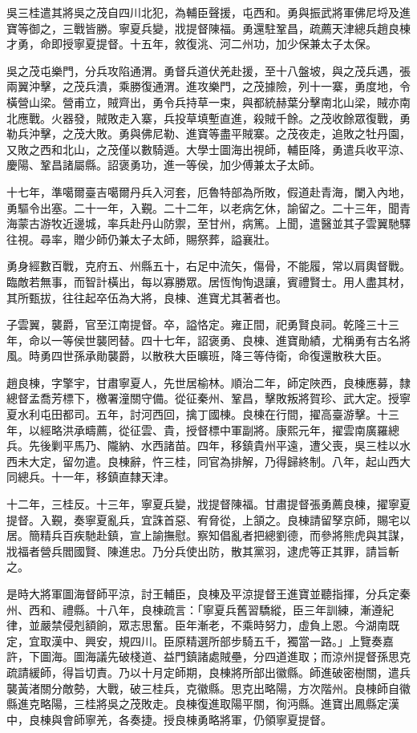 \begin{pinyinscope}
吳三桂遣其將吳之茂自四川北犯，為輔臣聲援，屯西和。勇與振武將軍佛尼埒及進寶等御之，三戰皆勝。寧夏兵變，戕提督陳福。勇還駐鞏昌，疏薦天津總兵趙良棟才勇，命即授寧夏提督。十五年，敘復洮、河二州功，加少保兼太子太保。

吳之茂屯樂門，分兵攻陷通渭。勇督兵道伏羌赴援，至十八盤坡，與之茂兵遇，張兩翼沖擊，之茂兵潰，乘勝復通渭。進攻樂門，之茂據險，列十一寨，勇度地，令橫營山梁。營甫立，賊齊出，勇令兵持草一束，與都統赫葉分擊南北山梁，賊亦南北應戰。火器發，賊敗走入寨，兵投草填塹直進，殺賊千餘。之茂收餘眾復戰，勇勒兵沖擊，之茂大敗。勇與佛尼勒、進寶等盡平賊寨。之茂夜走，追敗之牡丹園，又敗之西和北山，之茂僅以數騎遁。大學士圖海出視師，輔臣降，勇遣兵收平涼、慶陽、鞏昌諸屬縣。詔褒勇功，進一等侯，加少傅兼太子太師。

十七年，準噶爾臺吉噶爾丹兵入河套，厄魯特部為所敗，假道赴青海，闌入內地，勇驅令出塞。二十一年，入覲。二十二年，以老病乞休，諭留之。二十三年，聞青海蒙古游牧近邊城，率兵赴丹山防禦，至甘州，病篤。上聞，遣醫並其子雲翼馳驛往視。尋率，贈少師仍兼太子太師，賜祭葬，謚襄壯。

勇身經數百戰，克府五、州縣五十，右足中流矢，傷骨，不能履，常以肩輿督戰。臨敵若無事，而智計橫出，每以寡勝眾。居恆恂恂退讓，賓禮賢士。用人盡其材，其所甄拔，往往起卒伍為大將，良棟、進寶尤其著者也。

子雲翼，襲爵，官至江南提督。卒，謚恪定。雍正間，祀勇賢良祠。乾隆三十三年，命以一等侯世襲罔替。四十七年，詔褒勇、良棟、進寶勛績，尤稱勇有古名將風。時勇四世孫承勛襲爵，以散秩大臣曠班，降三等侍衛，命復還散秩大臣。

趙良棟，字擎宇，甘肅寧夏人，先世居榆林。順治二年，師定陜西，良棟應募，隸總督孟喬芳標下，檄署潼關守備。從征秦州、鞏昌，擊敗叛將賀珍、武大定。授寧夏水利屯田都司。五年，討河西回，擒丁國棟。良棟在行間，擢高臺游擊。十三年，以經略洪承疇薦，從征雲、貴，授督標中軍副將。康熙元年，擢雲南廣羅總兵。先後剿平馬乃、隴納、水西諸苗。四年，移鎮貴州平遠，遭父喪，吳三桂以水西未大定，留勿遣。良棟辭，忤三桂，同官為排解，乃得歸終制。八年，起山西大同總兵。十一年，移鎮直隸天津。

十二年，三桂反。十三年，寧夏兵變，戕提督陳福。甘肅提督張勇薦良棟，擢寧夏提督。入覲，奏寧夏亂兵，宜誅首惡、宥脅從，上頷之。良棟請留孥京師，賜宅以居。簡精兵百疾馳赴鎮，宣上諭撫慰。察知倡亂者把總劉德，而參將熊虎與其謀，戕福者營兵閻國賢、陳進忠。乃分兵使出防，散其黨羽，逮虎等正其罪，請旨斬之。

是時大將軍圖海督師平涼，討王輔臣，良棟及平涼提督王進寶並聽指揮，分兵定秦州、西和、禮縣。十八年，良棟疏言：「寧夏兵舊習驕縱，臣三年訓練，漸遵紀律，並嚴禁侵剋額餉，眾志思奮。臣年漸老，不乘時努力，虛負上恩。今湖南既定，宜取漢中、興安，規四川。臣原精選所部步騎五千，獨當一路。」上覽奏嘉許，下圖海。圖海議先破棧道、益門鎮諸處賊壘，分四道進取；而涼州提督孫思克疏請緩師，得旨切責。乃以十月定師期，良棟將所部出徽縣。師進破密樹關，遣兵襲黃渚關分敵勢，大戰，破三桂兵，克徽縣。思克出略陽，方次階州。良棟師自徽縣進克略陽，三桂將吳之茂敗走。良棟復進取陽平關，徇沔縣。進寶出鳳縣定漢中，良棟與會師寧羌，各奏捷。授良棟勇略將軍，仍領寧夏提督。


\end{pinyinscope}
